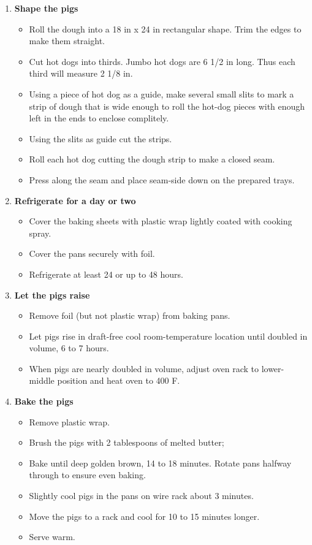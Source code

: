 \documentclass[11pt,letterpaper]{article}
\newcommand \fileName {PigsOnBlanket}
\begin{document}
\begin{description}
\begin{enumerate}
	\item {\bf Shape the pigs}
		\begin{itemize}
		\item Roll the dough into a 18 in x 24 in rectangular shape. Trim the edges to make them straight.
		\item Cut hot dogs into thirds. Jumbo hot dogs are 6 1/2 in long. Thus each third will measure 2 1/8 in.
		\item Using a piece of hot dog as a guide, make several small slits to mark a strip of dough that is wide enough to roll the hot-dog pieces with enough left in the ends to enclose complitely.
		\item Using the slits as guide cut the strips. 
		\item Roll each hot dog cutting the dough strip to make a closed seam. 
		\item Press along the seam and place seam-side down on the prepared trays.
		\end{itemize}
		
	\item {\bf Refrigerate for a day or two}
		\begin{itemize}
		\item Cover the baking sheets with plastic wrap lightly coated with cooking spray.
		\item Cover the pans securely with foil. 
		\item Refrigerate at least 24 or up to 48 hours.
		\end{itemize}

	\item {\bf Let the pigs raise}
		\begin{itemize}
		\item Remove foil (but not plastic wrap) from baking pans.
		\item Let pigs rise in draft-free cool room-temperature
location until doubled in volume, 6 to 7 hours. 
		\item When pigs are nearly doubled in volume,
adjust oven rack to lower-middle position and heat oven to 400 F.
		\end{itemize}

	\item {\bf Bake the pigs}
		\begin{itemize}
		\item Remove plastic wrap. 
		\item Brush the pigs with 2 tablespoons of melted butter; 
		\item Bake until deep golden brown, 14 to 18 minutes. Rotate pans halfway through to ensure even baking.  
		\item Slightly cool pigs in the pans on wire rack about 3 minutes.
		\item Move the pigs to a rack and cool for 10 to 15 minutes longer. 
		\item Serve warm.
		\end{itemize}
	\end{enumerate}
\end{description}


\end{document}
